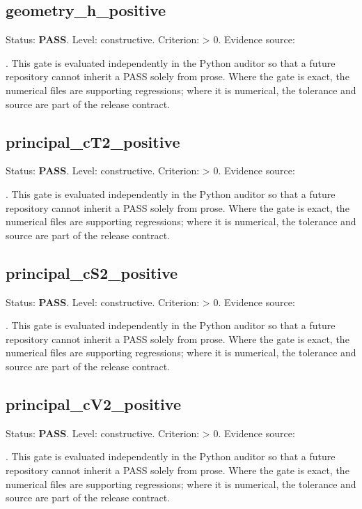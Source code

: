 \documentclass[11pt,a4paper,oneside]{book}
\begin{document}
\subsection{geometry\_h\_positive}
Status: \textbf{PASS}. Level: constructive. Criterion: > 0. Evidence source:\par\noindent{}. This gate is evaluated independently in the Python auditor so that a future repository cannot inherit a PASS solely from prose. Where the gate is exact, the numerical files are supporting regressions; where it is numerical, the tolerance and source are part of the release contract.\par

\subsection{principal\_cT2\_positive}
Status: \textbf{PASS}. Level: constructive. Criterion: > 0. Evidence source:\par\noindent{}. This gate is evaluated independently in the Python auditor so that a future repository cannot inherit a PASS solely from prose. Where the gate is exact, the numerical files are supporting regressions; where it is numerical, the tolerance and source are part of the release contract.\par

\subsection{principal\_cS2\_positive}
Status: \textbf{PASS}. Level: constructive. Criterion: > 0. Evidence source:\par\noindent{}. This gate is evaluated independently in the Python auditor so that a future repository cannot inherit a PASS solely from prose. Where the gate is exact, the numerical files are supporting regressions; where it is numerical, the tolerance and source are part of the release contract.\par

\subsection{principal\_cV2\_positive}
Status: \textbf{PASS}. Level: constructive. Criterion: > 0. Evidence source:\par\noindent{}. This gate is evaluated independently in the Python auditor so that a future repository cannot inherit a PASS solely from prose. Where the gate is exact, the numerical files are supporting regressions; where it is numerical, the tolerance and source are part of the release contract.\par
\end{document}
